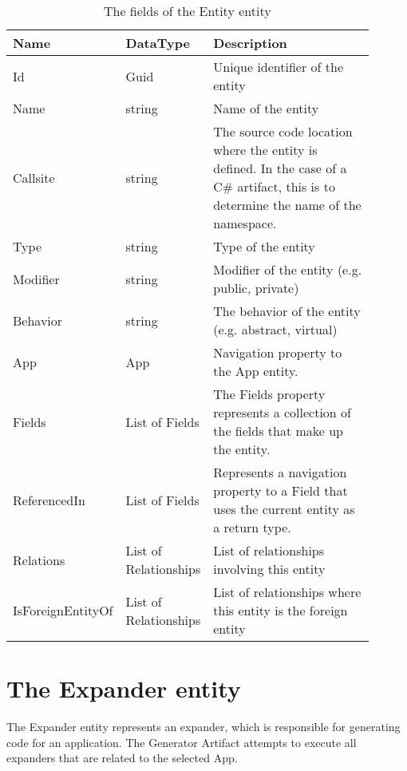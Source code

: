 \begin{table}[H]
\small
\begin{tabular}{ p{0.20\linewidth} p{0.23\linewidth} p{0.47\linewidth} }
\hline
\textbf{Name} & \textbf{DataType} & \textbf{Description} \\
\hline
Id & Guid & Unique identifier of the entity \\
Name & string & Name of the entity \\
Callsite & string & The source code location where the entity is defined. In the case of a C\#
artifact, this is to determine the name of the namespace.\\
Type & string & Type of the entity \\
Modifier & string & Modifier of the entity (e.g. public, private) \\
Behavior & string & The behavior of the entity (e.g. abstract, virtual) \\
App & App & Navigation property to the App entity. \\
Fields & List of Fields & The Fields property represents a collection of the fields that
make up the entity. \\
ReferencedIn & List of Fields & Represents a navigation property to a Field that uses the
current entity as a return type. \\
Relations & List of Relationships & List of relationships involving this entity \\
IsForeignEntityOf & List of Relationships & List of relationships where this entity is the foreign entity \\
\hline
\end{tabular}
\caption{The fields of the Entity entity}
\label{table:entity_entity}
\end{table}

\section{The Expander entity}

The Expander entity represents an expander, which is responsible for generating code for
an application. The Generator Artifact attempts to execute all expanders that are related
to the selected App.

